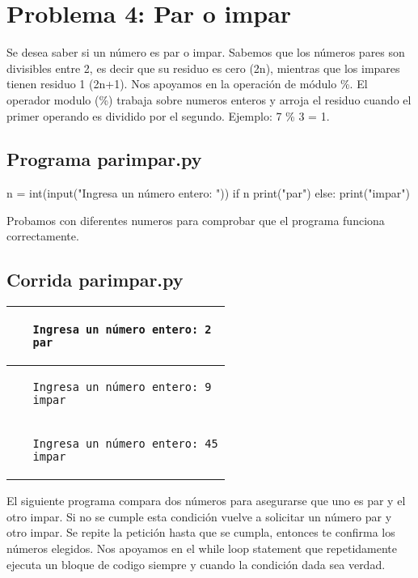 \documentclass[12pt,spanish]{article}
\begin{document}
\section*{Problema 4: Par o impar}

Se desea saber si un número es par o impar. Sabemos que los números pares son divisibles entre 2, es decir que su residuo es cero (2n), mientras que los impares tienen residuo 1 (2n+1). Nos apoyamos en la operación de módulo \%. El operador modulo (\%) trabaja sobre numeros enteros y arroja el residuo cuando el primer operando es dividido por el segundo. Ejemplo: 7 \% 3 = 1.


\subsection*{Programa parimpar.py}

\begin{center}
 \begin{boxedverbatim}
  n = int(input("Ingresa un número entero: "))
  if n%
     print("par")
  else:
     print("impar")
 \end{boxedverbatim}
\end{center}

Probamos con diferentes numeros para comprobar que el programa funciona correctamente.

\subsection*{Corrida parimpar.py}

\begin{center}
\begin{tabular}{| m{7cm} |}
  \hline
  \begin{verbatim}
   Ingresa un número entero: 2
   par
  \end{verbatim}
  \\ \hline
  \begin{verbatim}
   Ingresa un número entero: 9
   impar
  \end{verbatim}
   \\ \hline
  \begin{verbatim}
   Ingresa un número entero: 45
   impar
  \end{verbatim}
  \\ \hline
\end{tabular}
\end{center}

El siguiente programa compara dos números para asegurarse que uno es par y el otro impar. Si no se cumple esta condición vuelve a solicitar un número par y otro impar. Se repite la petición hasta que se cumpla, entonces te confirma los números elegidos. Nos apoyamos en el while loop statement que repetidamente ejecuta un bloque de codigo siempre y cuando la condición dada sea verdad.
\end{document}
